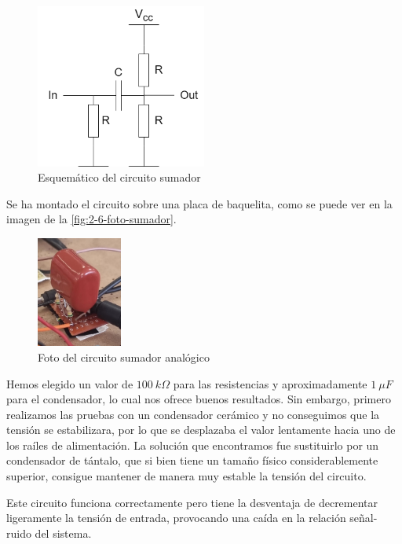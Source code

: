 \begin{figure}[h]
    \centering
    \includegraphics[width=0.5\textwidth]{images/2/2-6/sumadorEsquematico.png}
    \caption{Esquemático del circuito sumador}
    \label{fig:2-6-sumador}
\end{figure}

Se ha montado el circuito sobre una placa de baquelita, como se puede ver en la imagen de la \autoref{fig:2-6-foto-sumador}.\ 

\begin{figure}[h]
    \centering
    \includegraphics[width=0.25\textwidth]{images/2/2-6/fotoSumador.jpg}
    \caption{Foto del circuito sumador analógico}
    \label{fig:2-6-foto-sumador}
\end{figure}

Hemos elegido un valor de $100\ k\Omega$ para las resistencias y aproximadamente $1\ \mu F$ para el condensador, lo cual nos ofrece buenos resultados. Sin embargo, primero realizamos las pruebas con un condensador cerámico y no conseguimos que la tensión se estabilizara, por lo que se desplazaba el valor lentamente hacia uno de los raíles de alimentación. La solución que encontramos fue sustituirlo por un condensador de tántalo, que si bien tiene un tamaño físico considerablemente superior, consigue mantener de manera muy estable la tensión del circuito.

Este circuito funciona correctamente pero tiene la desventaja de decrementar ligeramente la tensión de entrada, provocando una caída en la relación señal-ruido del sistema.

